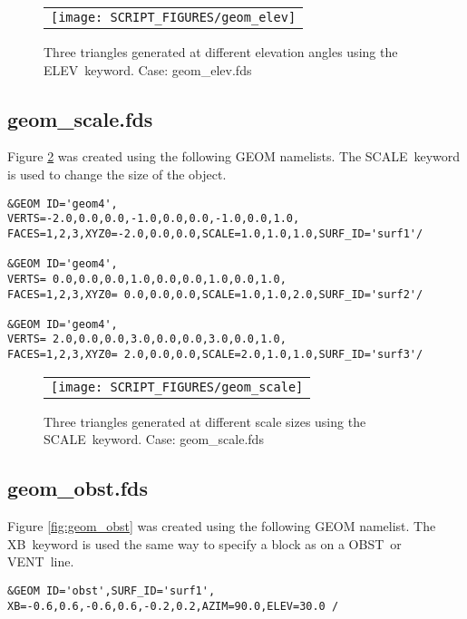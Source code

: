\documentclass[12pt]{article}
\begin{document}
\begin{figure}
\begin{center}
\begin{tabular}{c}
 \texttt{[image: SCRIPT\_FIGURES/geom\_elev]}
  \end{tabular}
\end{center}
 \caption{Three triangles generated at different elevation angles using the {\ct ELEV}\ keyword. Case: geom\_elev.fds}
\label{fig:geom_elev}
\end{figure}

\subsection{geom\_scale.fds}
Figure \ref{fig:geom_scale} was created using the following GEOM namelists.
The {\ct SCALE}\ keyword is used to change the size of the object.

{\small
\begin{verbatim}
&GEOM ID='geom4',
VERTS=-2.0,0.0,0.0,-1.0,0.0,0.0,-1.0,0.0,1.0,
FACES=1,2,3,XYZ0=-2.0,0.0,0.0,SCALE=1.0,1.0,1.0,SURF_ID='surf1'/

&GEOM ID='geom4',
VERTS= 0.0,0.0,0.0,1.0,0.0,0.0,1.0,0.0,1.0,
FACES=1,2,3,XYZ0= 0.0,0.0,0.0,SCALE=1.0,1.0,2.0,SURF_ID='surf2'/

&GEOM ID='geom4',
VERTS= 2.0,0.0,0.0,3.0,0.0,0.0,3.0,0.0,1.0,
FACES=1,2,3,XYZ0= 2.0,0.0,0.0,SCALE=2.0,1.0,1.0,SURF_ID='surf3'/
\end{verbatim}
}

\begin{figure}
\begin{center}
\begin{tabular}{c}
 \texttt{[image: SCRIPT\_FIGURES/geom\_scale]}
  \end{tabular}
\end{center}
\caption{Three triangles generated at different scale sizes using the {\ct SCALE}\ keyword. Case: geom\_scale.fds}
\label{fig:geom_scale}
\end{figure}

\subsection{geom\_obst.fds}
Figure \ref{fig:geom_obst} was created using the following GEOM namelist.
The {\ct XB}\ keyword is used the same way to specify a block as on
a {\ct OBST}\ or {\ct VENT}\ line.

{\scriptsize
\begin{verbatim}
&GEOM ID='obst',SURF_ID='surf1', XB=-0.6,0.6,-0.6,0.6,-0.2,0.2,AZIM=90.0,ELEV=30.0 /
\end{verbatim}
}
\end{document}
